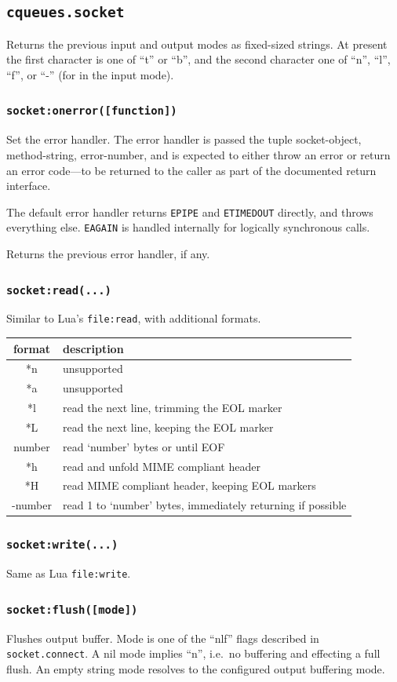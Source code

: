 \documentclass[11pt, oneside]{memoir}
\newcommand*{\fn}[1]{\texttt{#1}\xspace}
\newcommand*{\method}[1]{\texttt{#1}\xspace}
\newcommand*{\errno}[1]{\texttt{#1}\xspace}
\newcounter{toccols}
\newenvironment{Module}[1]{
	\subsection{\texttt{#1}}
	\addtocontents{toc}{
		\protect\begin{multicols}{\value{toccols}}
	}
}{
	\addtocontents{toc}{\protect\end{multicols}}
}
\begin{document}
\begin{Module}{cqueues.socket}
Returns the previous input and output modes as fixed-sized strings. At present the first character is one of ``t'' or ``b'', and the second character one of ``n'', ``l'', ``f'', or ``-'' (for in the input mode).

\subsubsection[\fn{socket:onerror}]{\fn{socket:onerror([function])}}
Set the error handler. The error handler is passed the tuple socket-object, method-string, error-number, and is expected to either throw an error or return an error code---to be returned to the caller as part of the documented return interface.

The default error handler returns \errno{EPIPE} and \errno{ETIMEDOUT} directly, and throws everything else. \errno{EAGAIN} is handled internally for logically synchronous calls.

Returns the previous error handler, if any.

\subsubsection[\fn{socket:read}]{\fn{socket:read(...)}}
	Similar to Lua's \fn{file:read}, with additional formats.

\begin{tabular}{c | l}
format & description\\\hline
{*n} & unsupported \\
{*a} & unsupported \\
{*l} & read the next line, trimming the EOL marker \\
{*L} & read the next line, keeping the EOL marker \\
number & read `number' bytes or until EOF \\
{*h} & read and unfold MIME compliant header \\
{*H} & read MIME compliant header, keeping EOL markers \\
-number & read 1 to `number' bytes, immediately returning if possible \\
\end{tabular}

\subsubsection[\fn{socket:write}]{\fn{socket:write(...)}}
	Same as Lua \fn{file:write}.

\subsubsection[\fn{socket:flush}]{\fn{socket:flush([mode])}}
Flushes output buffer. Mode is one of the ``nlf'' flags described in \method{socket.connect}. A nil mode implies ``n'', i.e.\ no buffering and  effecting a full flush. An empty string mode resolves to the configured output buffering mode.


\end{Module}
\end{document}
